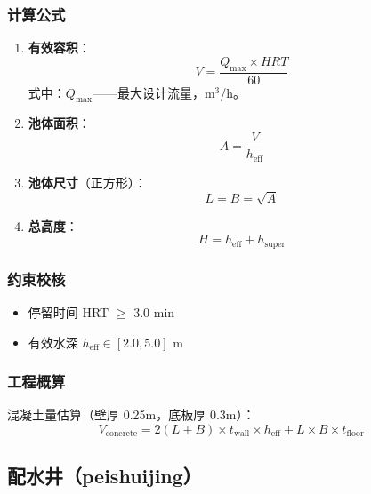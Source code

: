 \documentclass[12pt,a4paper]{ctexart}
\begin{document}
\subsubsection{计算公式}

\begin{enumerate}[label=(\arabic*), leftmargin=*]
    \item \textbf{有效容积}：
    \begin{equation}
        V = \frac{Q_{\max} \times HRT}{60}
    \end{equation}
    式中：$Q_{\max}$——最大设计流量，m$^3$/h。

    \item \textbf{池体面积}：
    \begin{equation}
        A = \frac{V}{h_{\text{eff}}}
    \end{equation}

    \item \textbf{池体尺寸}（正方形）：
    \begin{equation}
        L = B = \sqrt{A}
    \end{equation}

    \item \textbf{总高度}：
    \begin{equation}
        H = h_{\text{eff}} + h_{\text{super}}
    \end{equation}
\end{enumerate}

\subsubsection{约束校核}
\begin{itemize}[itemsep=0pt]
    \item 停留时间 HRT $\geq$ 3.0 min
    \item 有效水深 $h_{\text{eff}} \in [2.0, 5.0]$ m
\end{itemize}

\subsubsection{工程概算}

混凝土量估算（壁厚 0.25m，底板厚 0.3m）：
\begin{equation}
    V_{\text{concrete}} = 2(L + B) \times t_{\text{wall}} \times h_{\text{eff}} + L \times B \times t_{\text{floor}}
\end{equation}

\subsection{配水井（peishuijing）}
\end{document}
